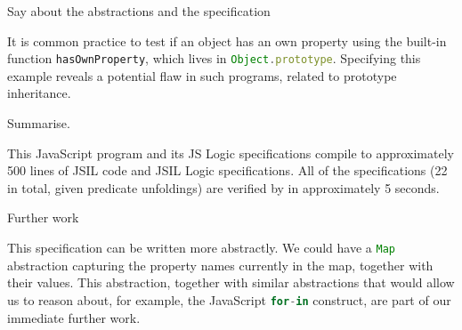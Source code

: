 \documentclass{llncs}
\newcommand{\polish}[1]{{\color{red}#1}}
\def\jsinline{\lstinline[language=JavaScript, basicstyle=\small]}
\begin{document}
\polish{Say about the abstractions and the specification}

It is common practice to test if an object has an own property using the built-in function \jsinline|hasOwnProperty|, which lives in \jsinline|Object.prototype|. Specifying this example reveals a potential flaw in such programs, related to prototype inheritance.

\polish{Summarise.}

This JavaScript program and its JS Logic specifications compile to approximately 500 lines of JSIL code and JSIL Logic specifications. All of the specifications (22 in total, given predicate unfoldings) are verified by \javert in approximately 5 seconds. 

\begin{display}{Further work}
\ \ \begin{minipage}{0.97\textwidth}
This specification can be written more abstractly. We could have a \jsinline|Map| abstraction capturing the property names currently in the map, together with their values. This abstraction, together with similar abstractions that would allow us to reason about, for example, the JavaScript \jsinline|for-in| construct, are part of our immediate further work.
\end{minipage}
\end{display}
\end{document}
